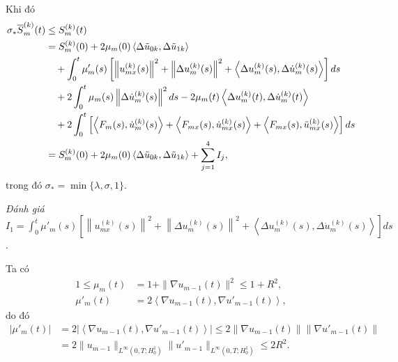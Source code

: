 \documentclass[12pt,a4paper]{article}
\theoremstyle{definition}
\theoremstyle{definition}
\begin{document}
Khi đó
\begin{align} \label{335}
    \sigma_* \overline{S}_m^{(k)}(t)
    &\le S_m^{(k)}(t) \notag \\
    &= S_m^{(k)}(0) + 2 \mu_m(0) \left< \Delta \tilde{u}_{0k}, \Delta \tilde{u}_{1k} \right> \\
    &\quad + \int_0^t \mu'_m(s) \left[\left\|u_{mx}^{(k)}(s)\right\|^2 + \left\|\Delta u_m^{(k)}(s)\right\|^2 + \left<\Delta u_m^{(k)}(s), \Delta \dot{u}_m^{(k)}(s)\right>\right] ds \notag \\
    &\quad + 2 \int_0^t \mu_m(s) \left\|\Delta \dot{u}_m^{(k)}(s)\right\|^2 ds - 2 \mu_m(t) \left<\Delta u_m^{(k)}(t), \Delta \dot{u}_m^{(k)}(t)\right> \notag \\
    &\quad + 2 \int_0^t \left[\left<F_m(s), \dot{u}_m^{(k)}(s)\right> + \left< F_{mx}(s), \dot{u}_{mx}^{(k)}(s)\right> + \left<F_{mx}(s), \ddot{u}_{mx}^{(k)}(s)\right>\right] ds \notag \\
    &= S_m^{(k)}(0) + 2 \mu_m(0) \left< \Delta \tilde{u}_{0k}, \Delta \tilde{u}_{1k} \right> + \sum_{j=1}^4 I_j, \notag
\end{align}
trong đó $\sigma_* = \min \{ \lambda, \sigma, 1 \}$.

\textit{Đánh giá} $\displaystyle I_1 = \int_0^t \mu'_m(s) \left[\left\|u_{mx}^{(k)}(s)\right\|^2 + \left\|\Delta u_m^{(k)}(s)\right\|^2 + \left<\Delta u_m^{(k)}(s), \Delta \dot{u}_m^{(k)}(s)\right>\right] ds$.

Ta có
\begin{align*}
    1 \le \mu_m(t) &= 1 + \|\nabla u_{m-1}(t)\|^2 \le 1 + R^2, \\
    \mu'_m(t) &= 2 \left< \nabla u_{m-1}(t), \nabla u'_{m-1}(t) \right>,
\end{align*}
do đó
\begin{align*}
    |\mu'_m(t)|
    &= 2 \left|\left<\nabla u_{m-1}(t), \nabla u'_{m-1}(t)\right>\right|
    \le 2 \| \nabla u_{m-1}(t) \| \| \nabla u'_{m-1}(t) \| \\
    &= 2 \| u_{m-1} \|_{L^\infty (0,T;H^1_0)} \| u'_{m-1} \|_{L^\infty(0,T;H^1_0)}
    \le 2 R^2.
\end{align*}
\end{document}
